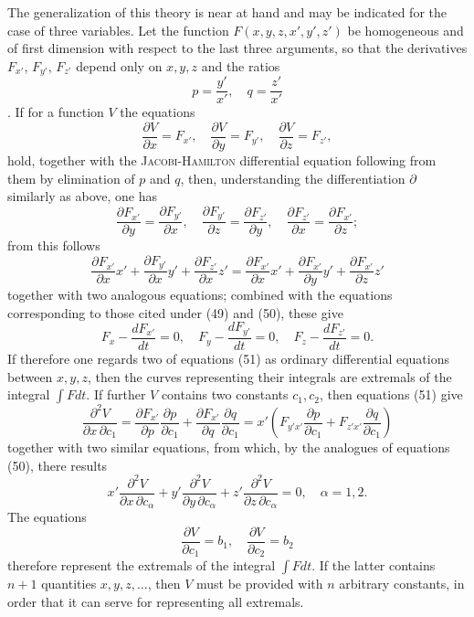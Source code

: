 \documentclass[11pt,a4paper,leqno]{article}
\begin{document}
The generalization of this theory is near at hand and may be indicated for the case of three variables. Let the function $F(x,y,z,x',y',z')$ be homogeneous and of first dimension with respect to the last three arguments, so that the derivatives $F_{x'}$, $F_{y'}$, $F_{z'}$ depend only on $x,y,z$ and the ratios
\[
p=\frac{y'}{x'},\quad q=\frac{z'}{x'}
\]
. If for a function $V$ the equations
\begin{equation}\tag{51}
\frac{\partial V}{\partial x}=F_{x'},\quad
\frac{\partial V}{\partial y}=F_{y'},\quad
\frac{\partial V}{\partial z}=F_{z'},
\end{equation}
hold, together with the \textsc{Jacobi-Hamilton} differential equation following from them by elimination of $p$ and $q$, then, understanding the differentiation $\partial$ similarly as above, one has
\[
\frac{\partial F_{x'}}{\partial y}=\frac{\partial F_{y'}}{\partial x},\quad
\frac{\partial F_{y'}}{\partial z}=\frac{\partial F_{z'}}{\partial y},\quad
\frac{\partial F_{z'}}{\partial x}=\frac{\partial F_{x'}}{\partial z};
\]
from this follows
\[
\frac{\partial F_{x'}}{\partial x}x'
+\frac{\partial F_{y'}}{\partial x}y'
+\frac{\partial F_{z'}}{\partial x}z'
=
\frac{\partial F_{x'}}{\partial x}x'
+\frac{\partial F_{x'}}{\partial y}y'
+\frac{\partial F_{x'}}{\partial z}z'
\]
together with two analogous equations; combined with the equations corresponding to those cited under (49) and (50), these give
\[
F_x-\frac{dF_{x'}}{dt}=0,\quad
F_y-\frac{dF_{y'}}{dt}=0,\quad
F_z-\frac{dF_{z'}}{dt}=0.
\]
If therefore one regards two of equations (51) as ordinary differential equations between $x,y,z$, then the curves representing their integrals are extremals of the integral $\int Fdt$. If further $V$ contains two constants $c_1,c_2$, then equations (51) give
\[
\frac{\partial^2V}{\partial x\,\partial c_1}
=
\frac{\partial F_{x'}}{\partial p}\frac{\partial p}{\partial c_1}
+
\frac{\partial F_{x'}}{\partial q}\frac{\partial q}{\partial c_1}
=
x'\left(
F_{y'x'}\frac{\partial p}{\partial c_1}
+
F_{z'x'}\frac{\partial q}{\partial c_1}
\right)
\]
together with two similar equations, from which, by the analogues of equations (50), there results
\[
x'\frac{\partial^2V}{\partial x\,\partial c_\alpha}
+
y'\frac{\partial^2V}{\partial y\,\partial c_\alpha}
+
z'\frac{\partial^2V}{\partial z\,\partial c_\alpha}
=0,\quad \alpha=1,2.
\]
The equations
\[
\frac{\partial V}{\partial c_1}=b_1,\quad
\frac{\partial V}{\partial c_2}=b_2
\]
therefore represent the extremals of the integral $\int Fdt$. If the latter contains $n+1$ quantities $x,y,z,\ldots$, then $V$ must be provided with $n$ arbitrary constants, in order that it can serve for representing all extremals.
\end{document}
